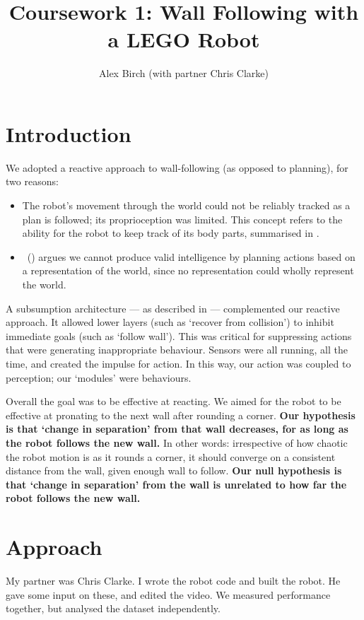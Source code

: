 \documentclass[a4paper,12pt]{article}
\title{Coursework 1:  Wall Following with a LEGO Robot}
\author{Alex Birch (with partner Chris Clarke)}
\newcommand{\citeauthoryear}[1]{%
 \citeauthor{#1}%
 ~(\citeyear{#1})}
\begin{document}
\maketitle

\section{Introduction}
We adopted a reactive approach to wall-following (as opposed to planning), for two reasons:
\begin{itemize}
\item The robot's movement through the world could not be reliably tracked as a plan is followed; its proprioception was limited. This concept refers to the ability for the robot to keep track of its body parts, summarised in \parencite{lee2002proprioception}.
\item \citeauthoryear{brooks1991intelligence} argues we cannot produce valid intelligence by planning actions based on a representation of the world, since no representation could wholly represent the world.
\end{itemize}
A subsumption architecture --- as described in \parencite{brooks1991intelligence} --- complemented our reactive approach. It allowed lower layers (such as `recover from collision') to inhibit immediate goals (such as `follow wall'). This was critical for suppressing actions that were generating inappropriate behaviour. Sensors were all running, all the time, and created the impulse for action. In this way, our action was coupled to perception; our `modules' were behaviours.

Overall the goal was to be effective at reacting. We aimed for the robot to be effective at pronating to the next wall after rounding a corner. \textbf{Our hypothesis is that `change in separation' from that wall decreases, for as long as the robot follows the new wall.} In other words: irrespective of how chaotic the robot motion is as it rounds a corner, it should converge on a consistent distance from the wall, given enough wall to follow. \textbf{Our null hypothesis is that `change in separation' from the wall is unrelated to how far the robot follows the new wall.}
\section{Approach}
My partner was Chris Clarke. I wrote the robot code and built the robot. He gave some input on these, and edited the video. We measured performance together, but analysed the dataset independently.
\end{document}
